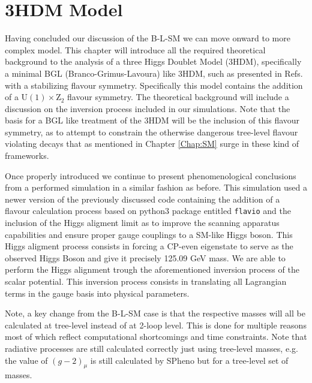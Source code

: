 %

\renewcommand{\cleardoublepage}{}
\renewcommand{\clearpage}{}

\newpage 

\chapter{3HDM Model}
\label{ch:3HDM}

Having concluded our discussion of the B-L-SM we can move onward to more complex model.
%
This chapter will introduce all the required theoretical background to the analysis of a three Higgs Doublet Model (3HDM), specifically a minimal BGL (Branco-Grimus-Lavoura) like 3HDM, such as presented in Refs.~\cite{Ludvig_Thesis,Ian_Thesis} with a stabilizing flavour symmetry. 
% 
Specifically this model contains the addition of a $\mathrm{U}(1) \times \mathrm{Z}_2$ flavour symmetry.
% 
The theoretical background will include a discussion on the inversion process included in our simulations. 
%
Note that the basis for a BGL like treatment of the 3HDM will be the inclusion of this flavour symmetry, as to attempt to constrain the otherwise dangerous tree-level flavour violating decays that as mentioned in Chapter \ref{Chap:SM} surge in these kind of frameworks. 

Once properly introduced we continue to present phenomenological conclusions from a performed simulation in a similar fashion as before. 
%
This simulation used a newer version of the previously discussed code containing the addition of a flavour calculation process based on python3 package entitled \texttt{flavio} \cite{straub2018flavio} and the inclusion of the Higgs aligment limit as to improve the scanning apparatus capabilities and ensure proper gauge couplings to a SM-like Higgs boson.
%
This Higgs aligment process consists in forcing a CP-even eigenstate to serve as the observed Higgs Boson and give it precisely 125.09 GeV mass.   
%
We are able to perform the Higgs alignment trough the aforementioned inversion process of the scalar potential. 
%
This inversion process consists in translating all Lagrangian terms in the gauge basis into physical parameters. 


Note, a key change from the B-L-SM case is that the respective masses will all be calculated at tree-level instead of at 2-loop level. 
%
This is done for multiple reasons most of which reflect computational shortcomings and time constraints.
%
Note that radiative processes are still calculated correctly just using tree-level masses, e.g. the value of $(g-2)_\mu$ is still calculated by SPheno but for a tree-level set of masses.

